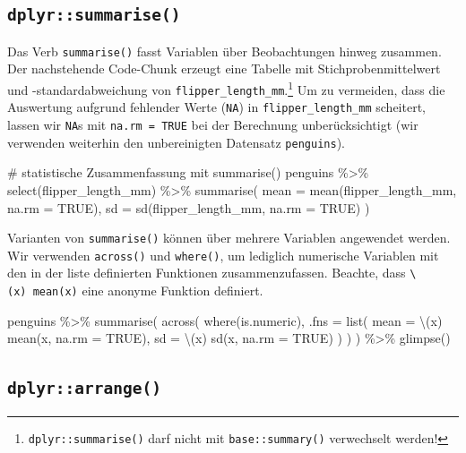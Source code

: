 \documentclass[
  a4paper,
  DIV=11,
  oneside]{scrreprt}
\newenvironment{Shaded}{\begin{snugshade}}{\end{snugshade}}
\newcommand{\NormalTok}[1]{\textcolor[rgb]{0.00,0.23,0.31}{#1}}
\begin{document}
\subsection{\texorpdfstring{\texttt{dplyr::summarise()}}{dplyr::summarise()}}\label{dplyrsummarise}

Das Verb \texttt{summarise()} fasst Variablen über Beobachtungen hinweg
zusammen. Der nachstehende Code-Chunk erzeugt eine Tabelle mit
Stichprobenmittelwert und -standardabweichung von
\texttt{flipper\_length\_mm}.\footnote{\texttt{dplyr::summarise()} darf
  nicht mit \texttt{base::summary()} verwechselt werden!} Um zu
vermeiden, dass die Auswertung aufgrund fehlender Werte (\texttt{NA}) in
\texttt{flipper\_length\_mm} scheitert, lassen wir \texttt{NA}s mit
\texttt{na.rm\ =\ TRUE} bei der Berechnung unberücksichtigt (wir
verwenden weiterhin den unbereinigten Datensatz \texttt{penguins}).

\begin{Shaded}
\begin{Highlighting}[]
\NormalTok{\# statistische Zusammenfassung mit \textquotesingle{}summarise()\textquotesingle{}}
\NormalTok{penguins \%\textgreater{}\% }
\NormalTok{  select(flipper\_length\_mm) \%\textgreater{}\% }
\NormalTok{  summarise(}
\NormalTok{    mean = mean(flipper\_length\_mm, na.rm = TRUE), }
\NormalTok{    sd = sd(flipper\_length\_mm, na.rm = TRUE)}
\NormalTok{  )}
\end{Highlighting}
\end{Shaded}

Varianten von \texttt{summarise()} können über mehrere Variablen
angewendet werden. Wir verwenden \texttt{across()} und \texttt{where()},
um lediglich numerische Variablen mit den in der liste definierten
Funktionen zusammenzufassen. Beachte, dass
\texttt{\textbackslash{}(x)\ mean(x)} eine anonyme Funktion definiert.

\begin{Shaded}
\begin{Highlighting}[]
\NormalTok{penguins \%\textgreater{}\% }
\NormalTok{  summarise(}
\NormalTok{    across(}
\NormalTok{      where(is.numeric), }
\NormalTok{      .fns = list(}
\NormalTok{        mean = \textbackslash{}(x) mean(x, na.rm = TRUE), }
\NormalTok{        sd = \textbackslash{}(x) sd(x, na.rm = TRUE)}
\NormalTok{      )}
\NormalTok{    )}
\NormalTok{  ) \%\textgreater{}\%}
\NormalTok{  glimpse()}
\end{Highlighting}
\end{Shaded}

\subsection{\texorpdfstring{\texttt{dplyr::arrange()}}{dplyr::arrange()}}\label{dplyrarrange}
\end{document}
